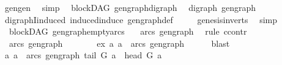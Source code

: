 \begin{isabellebody}
\ gen{\isacharunderscore}{\kern0pt}gen\ \isamarkupfalse%
\ simp%
\endisatagproof
{\isafoldproof}%
%
\isadelimproof
%
\endisadelimproof
\isanewline
\isanewline
{}\isamarkupfalse%
\ {\isacharparenleft}{\kern0pt}\ blockDAG{\isacharparenright}{\kern0pt}\ gen{\isacharunderscore}{\kern0pt}graph{\isacharunderscore}{\kern0pt}digraph{\isacharcolon}{\kern0pt}\isanewline
\ \ {\isachardoublequoteopen}digraph\ gen{\isacharunderscore}{\kern0pt}graph{\isachardoublequoteclose}\isanewline
%
\isadelimproof
\ \ %
\endisadelimproof
%
\isatagproof
{}\isamarkupfalse%
\ digraphI{\isacharunderscore}{\kern0pt}induced\ induced{\isacharunderscore}{\kern0pt}induce\ gen{\isacharunderscore}{\kern0pt}graph{\isacharunderscore}{\kern0pt}def\ \isanewline
\ \ \ \ genesis{\isacharunderscore}{\kern0pt}in{\isacharunderscore}{\kern0pt}verts\ \isamarkupfalse%
\ simp%
\endisatagproof
{\isafoldproof}%
%
\isadelimproof
\ \ \isanewline
%
\endisadelimproof
\isanewline
{}\isamarkupfalse%
\ {\isacharparenleft}{\kern0pt}\ blockDAG{\isacharparenright}{\kern0pt}\ gen{\isacharunderscore}{\kern0pt}graph{\isacharunderscore}{\kern0pt}empty{\isacharunderscore}{\kern0pt}arcs{\isacharcolon}{\kern0pt}\ \isanewline
\ \ {\isachardoublequoteopen}arcs\ gen{\isacharunderscore}{\kern0pt}graph\ {\isacharequal}{\kern0pt}\ {\isacharbraceleft}{\kern0pt}{\isacharbraceright}{\kern0pt}{\isachardoublequoteclose}\isanewline
%
\isadelimproof
%
\endisadelimproof
%
\isatagproof
{}\isamarkupfalse%
{\isacharparenleft}{\kern0pt}rule\ ccontr{\isacharparenright}{\kern0pt}\isanewline
\ \ \isamarkupfalse%
\ {\isachardoublequoteopen}{\isasymnot}\ arcs\ gen{\isacharunderscore}{\kern0pt}graph\ {\isacharequal}{\kern0pt}\ {\isacharbraceleft}{\kern0pt}{\isacharbraceright}{\kern0pt}{\isachardoublequoteclose}\isanewline
\ \ \isamarkupfalse%
\ \isamarkupfalse%
\ ex{\isacharcolon}{\kern0pt}\ {\isachardoublequoteopen}{\isasymexists}a{\isachardot}{\kern0pt}\ a\ {\isasymin}\ {\isacharparenleft}{\kern0pt}arcs\ gen{\isacharunderscore}{\kern0pt}graph{\isacharparenright}{\kern0pt}{\isachardoublequoteclose}\isanewline
\ \ \ \ \isamarkupfalse%
\ blast\isanewline
\ \ \isamarkupfalse%
\ \isamarkupfalse%
\ {\isachardoublequoteopen}{\isasymforall}a{\isachardot}{\kern0pt}\ a\ {\isasymin}\ {\isacharparenleft}{\kern0pt}arcs\ gen{\isacharunderscore}{\kern0pt}graph{\isacharparenright}{\kern0pt}{\isasymlongrightarrow}\ tail\ G\ a\ {\isacharequal}{\kern0pt}\ head\ G\ a{\isachardoublequoteclose}\isanewline

\end{isabellebody}
